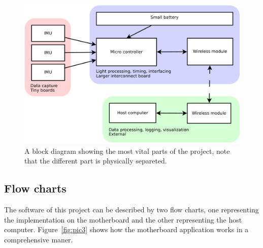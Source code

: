 \documentclass[a4paper, 12pt]{article}
\begin{document}
\begin{figure}[h!]
    \centering
    \includegraphics[scale=0.38]{block.pdf}
    \caption{A block diagram showing the most vital parts of the project, note that the different part is physically separeted.}
    \label{fig:pic2}
\end{figure}

\newpage
\subsection*{Flow charts}
The software of this project can be described by two flow charts, one representing the implementation on the motherboard and the other representing the host computer. Figure~\ref{fig:pic3} shows how the motherboard application works in a comprehensive maner. 
\end{document}
